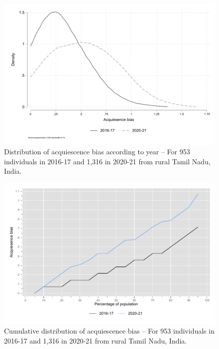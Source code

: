 \documentclass[a4paper, 12pt, onecolumn]{article}
\begin{document}
\begin{figure}[!h]
\raggedright
\includegraphics[scale=0.8]{INPUT/kernel_ars}
\caption{Distribution of acquiescence bias according to year -- For 953 individuals in 2016-17 and 1,316 in 2020-21 from rural Tamil Nadu, India.}
\label{fig:ars}
\end{figure}

\begin{figure}[!h]
\raggedright
\includegraphics[scale=0.8]{INPUT/curve_ars}
\caption{Cumulative distribution of acquiescence bias -- For 953 individuals in 2016-17 and 1,316 in 2020-21 from rural Tamil Nadu, India.}
\label{fig:curvears}
\end{figure}
\end{document}
